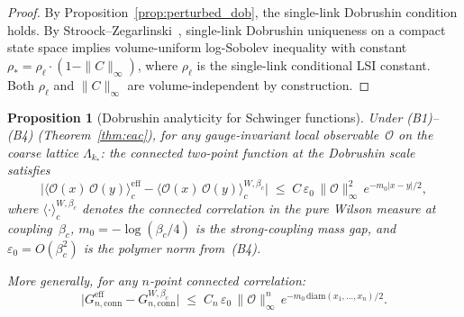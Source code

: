 \documentclass[11pt,a4paper]{article}
\theoremstyle{plain}
\newtheorem{proposition}[theorem]{Proposition}
\theoremstyle{definition}
\theoremstyle{remark}
\begin{document}
\begin{proof}
By Proposition~\ref{prop:perturbed_dob}, the single-link
Dobrushin condition holds.  By
Stroock--Zegarlinski~\cite{StroockZegarlinski},
single-link Dobrushin uniqueness on a compact state space
implies volume-uniform log-Sobolev inequality with
constant $\rho_* = \rho_\ell \cdot (1 - \|C\|_\infty)$,
where $\rho_\ell$ is the single-link conditional LSI constant.
Both $\rho_\ell$ and $\|C\|_\infty$ are volume-independent
by construction.
\end{proof}

\begin{proposition}[Dobrushin analyticity for Schwinger
functions]\label{prop:dob_analytic}
Under (B1)--(B4) (Theorem~\ref{thm:eac}), for any gauge-invariant
local observable~$\mathcal{O}$ on the coarse lattice
$\Lambda_{k_*}$: the connected two-point function at the
Dobrushin scale satisfies
\begin{equation}\label{eq:schwinger_bound}
  \bigl|\langle \mathcal{O}(x)\,\mathcal{O}(y)
  \rangle_{c}^{\mathrm{eff}}
  - \langle \mathcal{O}(x)\,\mathcal{O}(y)
  \rangle_{c}^{W,\beta_c}\bigr|
  \;\leq\; C\,\varepsilon_0\,\|\mathcal{O}\|_\infty^2\,
  e^{-m_0|x-y|/2},
\end{equation}
where $\langle\cdot\rangle_c^{W,\beta_c}$ denotes the
connected correlation in the pure Wilson measure at
coupling~$\beta_c$, $m_0 = -\log(\beta_c/4)$ is the
strong-coupling mass gap, and
$\varepsilon_0 = O(\beta_c^2)$ is the polymer norm
from~\textup{(B4)}.

More generally, for any $n$-point connected correlation:
\begin{equation}\label{eq:schwinger_n}
  \bigl|G_{n,\mathrm{conn}}^{\mathrm{eff}}
  - G_{n,\mathrm{conn}}^{W,\beta_c}\bigr|
  \;\leq\; C_n\,\varepsilon_0\,\|\mathcal{O}\|_\infty^n\,
  e^{-m_0\,\mathrm{diam}(x_1,\ldots,x_n)/2}.
\end{equation}
\end{proposition}
\end{document}
